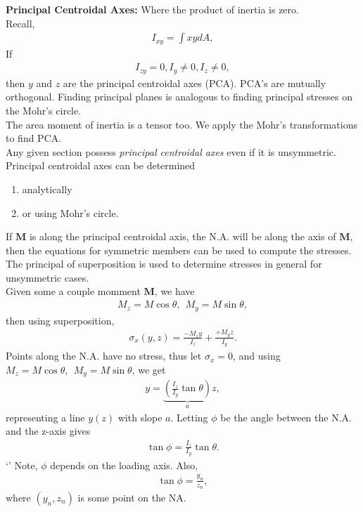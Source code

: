 \documentclass{article}
\numberwithin{equation}{subsection}
\newcommand{\bb}[1]{\mathbf{#1}}
\begin{document}
\textbf{Principal Centroidal Axes:}
Where the product of inertia is zero. 
\\

Recall,
\begin{align*}
  I_{xy} = \int xy dA,
\end{align*}
If
\begin{align*}
  I_{zy} = 0, I_y \neq 0, I_z \neq 0,
\end{align*}
then $y$ and $z$ are the principal centroidal axes (PCA). PCA's are mutually orthogonal.
Finding principal planes is analogous to finding principal stresses on the Mohr's circle.
\\

The area moment of inertia is a tensor too. We apply the Mohr's transformations to find PCA.
\\

Any given section possess \emph{principal centroidal axes} even if it is unsymmetric.
Principal centroidal axes can be determined 
\begin{enumerate}
  \item analytically
  \item or using Mohr's circle.
\end{enumerate}
If $\bb{M}$ is along the principal centroidal axis, the N.A. will be along the axis of $\bb{M}$,
then the equations for symmetric members can be used to compute the stresses.
The principal of superposition is used to determine stresses in general for unsymmetric cases.
\\

Given some a couple momment $\bb{M}$, we have
\begin{align*}
  M_z = M\cos\theta,~~ M_y = M\sin\theta,
\end{align*}
then using superposition,
\begin{align*}
  \sigma_x(y,z) = \frac{-M_z y}{I_z} + \frac{+M_y z}{I_y}.
\end{align*}
Points along the N.A. have no stress, thus let $\sigma_x = 0$, and using
$M_z = M\cos\theta,~~ M_y = M\sin\theta$, we get
\begin{align*}
  y = \underbrace{\left(\frac{I_z}{I_y}\tan\theta\right)}_a z,
\end{align*}
representing a line $y(z)$ with slope $a$.
Letting $\phi$ be the angle between the N.A. and the z-axis gives
\begin{align*}
  \tan\phi = \frac{I_z}{I_y}\tan\theta.
\end{align*}`'
Note, $\phi$ depends on the loading axis. Also,
\begin{align*}
  \tan\phi = \frac{y_n}{z_n},
\end{align*}
where $(y_n, z_n)$ is some point on the NA.
\\
\end{document}
